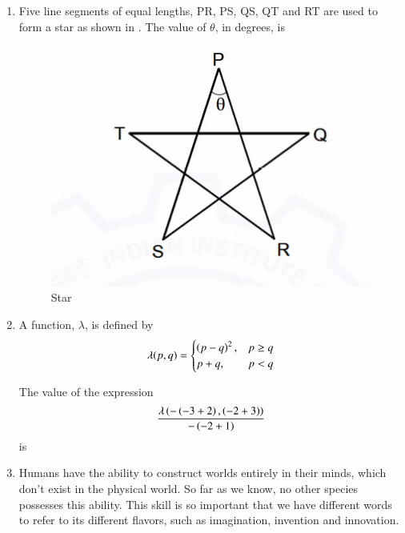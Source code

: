 \documentclass[journal,12pt,onecolumn]{IEEEtran}
\theoremstyle{remark}
\begin{document}
\begin{enumerate}
\item %
Five line segments of equal lengths, PR, PS, QS, QT and RT are used to form a star as shown in .  
The value of $\theta$, in degrees, is
\begin{figure}[H]
    \centering
    \includegraphics[width=0.4\linewidth]{Figs/Q-8(GA).png}
    \caption{Star}
    \label{8(GA)}
\end{figure}
\par \hfill{}
\begin{enumerate}
\end{enumerate}

\item A function, $\lambda$, is defined by
$$\lambda(p,q) =
\begin{cases}
 \left(p-q\right)^2, & p\ge q \\
 p+q, & p<q
\end{cases}$$

The value of the expression
$$\frac{ \lambda\left(-\left(-3+2\right),\left(-2+3\right)\right)}{ -\left(-2+1\right) }$$
is \par \hfill{}
\begin{enumerate}
\end{enumerate}

\item Humans have the ability to construct worlds entirely in their minds, which don't exist in the physical world. So far as we know, no other species possesses this ability. This skill is so important that we have different words to refer to its different flavors, such as imagination, invention and innovation.  


\end{enumerate}
\end{document}
